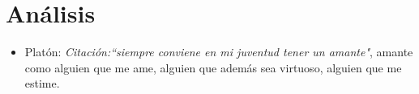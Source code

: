 \section{Análisis}
\begin{itemize}
    \item Platón: \emph{Citación:``siempre conviene en mi juventud tener un amante"}, amante como alguien que me ame, alguien que además sea virtuoso, alguien que me estime.
\end{itemize}

